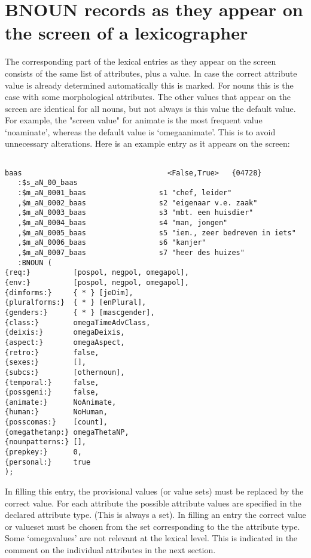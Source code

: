 \section{BNOUN records as they appear on the screen of a lexicographer}

The corresponding part of the 
lexical entries as they appear on the screen consists of the same list 
of attributes, plus a value. In case the correct attribute value 
is already determined automatically this is marked. For nouns this is the
case with some morphological attributes. 
The other values that appear on the screen are identical for all nouns, but not
always is this value the default value. For example, the "screen value" for 
animate is the most frequent value `noaminate', 
whereas the default value is `omegaanimate'. 
This is to avoid unnecessary alterations. 
Here is an example entry as it appears on the screen:
\begin{verbatim}

baas                                  <False,True>   {04728}
   :$s_aN_00_baas
   :$m_aN_0001_baas                 s1 "chef, leider"
   ,$m_aN_0002_baas                 s2 "eigenaar v.e. zaak"
   ,$m_aN_0003_baas                 s3 "mbt. een huisdier"
   ,$m_aN_0004_baas                 s4 "man, jongen"
   ,$m_aN_0005_baas                 s5 "iem., zeer bedreven in iets"
   ,$m_aN_0006_baas                 s6 "kanjer"
   ,$m_aN_0007_baas                 s7 "heer des huizes"
   :BNOUN (
{req:}          [pospol, negpol, omegapol],
{env:}          [pospol, negpol, omegapol],
{dimforms:}     { * } [jeDim],
{pluralforms:}  { * } [enPlural],
{genders:}      { * } [mascgender],
{class:}        omegaTimeAdvClass,
{deixis:}       omegaDeixis,
{aspect:}       omegaAspect,
{retro:}        false,
{sexes:}        [],
{subcs:}        [othernoun],
{temporal:}     false,
{possgeni:}     false,
{animate:}      NoAnimate,
{human:}        NoHuman,
{posscomas:}    [count],
{omegathetanp:} omegaThetaNP,
{nounpatterns:} [],
{prepkey:}      0,
{personal:}     true
);

\end{verbatim}

In filling this entry, the provisional values (or value sets) 
must be replaced by the correct value.
For each attribute the possible attribute values are specified in the
declared attribute type. (This is always a set).
In filling an entry the correct value or valueset must be chosen 
from the set corresponding to the the attribute type.
Some `omegavalues' are not relevant at the lexical level. This is indicated
in the comment on the individual attributes in the next section.\\

